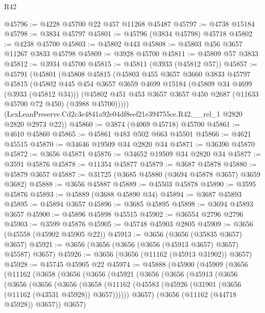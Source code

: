 \begin{lexlean}{R42}
\begin{coremodule}
@45796 := @4228 @45700 @22 @457 @11268 @45487
@45797 := @4738 @15184
@45798 := @3834 @45797
@45801 := @45796 (@3834 @45798) @45718
@45802 := @4238 @45700
@45803 := @45802 @443
@45808 := @45803 @456 @3657 @11267 @3833 @45798
@45809 := @3928 @45700
@45811 := @45809 @57 @3833
@45812 := @3934 @45700
@45815 := @45811 (@3933 (@45812 @57))
@45857 := @45791
    (@45801
      (@45808
        @45815
        (@45803
          @455
          @3657
          @3660
          @3833
          @45797
          @45815
          (@45802
            @445
            @454
            @3657
            @3659
            @4699
            @15184
            (@45809 @34 @4699 (@3933 (@45812 @34)))
            (@45802 @451 @453 @3657 @3657 @450 @2687 (@11633 @45700 @72 @450) (@3988 @45700)))))
      (LexLeanPreserve.Cd2c3e4841a92e04df8eef21e394755ce.R42.__rel_1 @2820 @2820 @2973 @22))
@45860 := @3874 (@4069 @45718) @45700
@45861 := @4610 @45860
@45865 := @45861 @483 @502 @663 @45501
@45866 := @4621 @45515
@45870 := @34646 @19509 @34 @2820 @34
@45871 := @36390 @45870
@45872 := @3656 @45871
@45876 := @34652 @19509 @34 @2820 @34
@45877 := @3591 @45876
@45878 := @11354 @45877
@45879 := @3687 @45878
@45880 := @45879 @3657
@45887 := @31725 (@3685 @45880 (@3694 @45878 @3657) @3659 @3682)
@45888 := @3656 @45887
@45889 := @45503 @45878
@45890 := @3595 @45876
@45893 := @45889 (@3688 @45890 @34)
@45894 := @3687 @45893
@45895 := @45894 @3657
@45896 := @3685 @45895
@45898 := @3694 @45893 @3657
@45900 := @45896 @45898 @45515
@45902 := @36554 @2796 @2796
@45903 := @3599 @45876
@45905 := @45748 @45903 @2805
@45909 := @3656 (@45558 (@45902 @45905 @22))
@45913 := @3656 (@3656 (@35835 @3657) @3657)
@45921 := @3656 (@3656 (@3656 (@3656 (@45913 @3657) @3657) @45587) @3657)
@45926 := @3656 (@3656 (@11162 (@45913 @31902)) @3657)
@45928 := @45745 @45905 @22
@45974 := @45888
    (@45900
      (@45909
        (@3656
          (@11162
            (@3658
              (@3656
                (@3656
                  (@45921
                    (@3656
                      (@3656
                        (@45913
                          (@3656
                            (@3656
                              (@3656
                                (@3656
                                  (@3658
                                    (@11162
                                      (@45583
                                        (@45926 (@31901 (@3656 (@11162 (@43531 @45928)) @3657))))))
                                  @3657)
                                (@3656 (@11162 (@44718 @45928)) @3657))
                              @3657)

\end{coremodule}
\end{lexlean}
